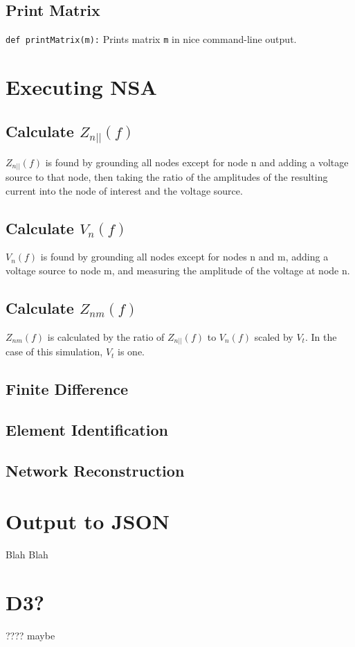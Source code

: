 \subsection{Print Matrix}
\texttt{def printMatrix(m):}
Prints matrix \texttt{m} in nice command-line output.

\section{Executing NSA}
\subsection{Calculate $Z_{n{||}}(f)$}
$Z_{n{||}}(f)$ is found by grounding all nodes except for node n and adding a voltage source to that node, then taking the ratio of the amplitudes of the resulting current into the node of interest and the voltage source.
\subsection{Calculate $V_n(f)$}
$V_n(f)$ is found by grounding all nodes except for nodes n and m, adding a voltage source to node m, and measuring the amplitude of the voltage at node n.
\subsection{Calculate $Z_{nm}(f)$}
$Z_{nm}(f)$ is calculated by the ratio of $Z_{n{||}}(f)$ to $V_n(f)$ scaled by $V_t$.
In the case of this simulation, $V_t$ is one.
\subsection{Finite Difference}

\subsection{Element Identification}

\subsection{Network Reconstruction}

\section{Output to JSON}
Blah Blah

\section{D3?}
???? maybe

%